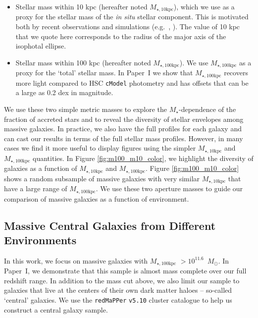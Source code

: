 \documentclass[a4paper,fleqn,usenatbib]{mnras}
\def\msun{$M_\odot$}
\def\redm{\texttt{redMaPPer}}
\def\cmodel{\texttt{cModel}}
\def\mstar{{$M_{\star}$}}
\def\minn{{$M_{\star,10\mathrm{kpc}}$}}
\def\mtot{{$M_{\star,100\mathrm{kpc}}$}}
\begin{document}
    \begin{itemize}
    
        \item Stellar mass within 10 kpc (hereafter noted \minn{}), which we use 
            as a proxy for the stellar mass of the \textit{in situ} stellar 
            component. 
            This is motivated both by recent observations and simulations 
            (e.g.~\citealt{vanDokkum2010}, \citealt{RodriguezGomez2016}). 
            The value of 10 kpc that we quote here corresponds to the radius of the 
            major axis of the isophotal ellipse.
            
        \item Stellar mass within 100 kpc (hereafter noted \mtot{}). 
            We use \mtot{} as a proxy for the `total' stellar mass. 
            In Paper~I we show that \mtot{} recovers more light compared to 
            HSC \cmodel{} photometry and has offsets that can be a large as 0.2 dex 
            in magnitude.        
               
   \end{itemize}
   
   We use these two simple metric masses to explore the \mstar{}-dependence of the 
   fraction of accreted stars and to reveal the diversity of stellar envelopes among 
   massive galaxies. 
   In practice, we also have the full profiles for each galaxy and can cast our 
   results in terms of the full stellar mass profiles. 
   However, in many cases we find it more useful to display figures using the simpler 
   \minn{} and \mtot{} quantities. 
   In Figure \ref{fig:m100_m10_color}, we highlight the diversity of galaxies as a 
   function of \minn{} and \mtot{}. 
   Figure \ref{fig:m100_m10_color} shows a random subsample of massive galaxies with 
   very similar \minn{} that have a large range of \mtot{}. 
   We use these two aperture masses to guide our comparison of massive galaxies 
   as a function of environment.  
    
\subsection{Massive Central Galaxies from Different Environments}
    \label{ssec:cen}
         
    In this work, we focus on massive galaxies with \mtot{} $>10^{11.6}$~\msun{}. 
    In Paper~I, we demonstrate that this sample is almost mass complete over our full 
    redshift range. 
    In addition to the mass cut above, we also limit our sample to galaxies that live 
    at the centers of their own dark matter haloes -- so-called `central' galaxies. 
    We use the \redm{} \texttt{v5.10} \citep{Rykoff2014, Rozo2015b} cluster catalogue 
    to help us construct a central galaxy sample.
    
\end{document}
